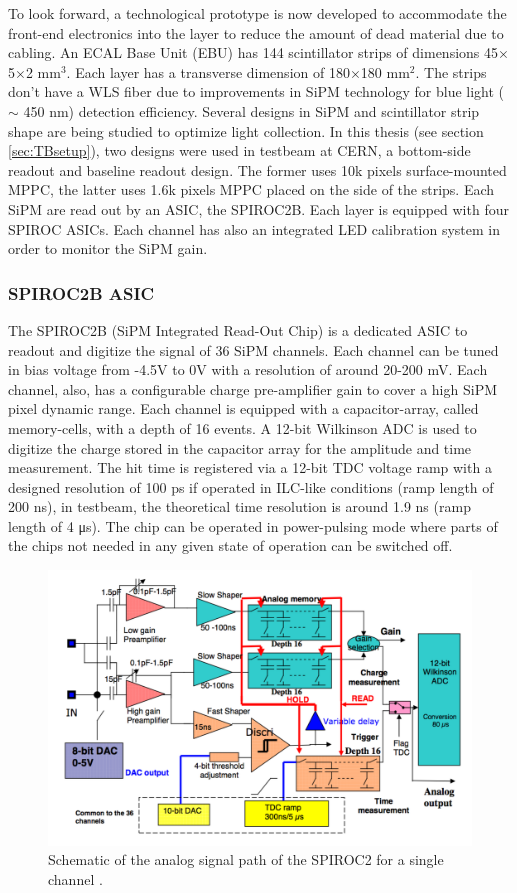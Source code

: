 To look forward, a technological prototype is now developed to accommodate the front-end electronics into the layer to reduce the amount of dead material due to cabling. An ECAL Base Unit (EBU) has 144 scintillator strips of dimensions 45$\times$5$\times$2 mm$^3$. Each layer has a transverse dimension of 180$\times$180 mm$^2$. The strips don't have a WLS fiber due to improvements in SiPM technology for blue light ($\sim$ 450 nm) detection efficiency. Several designs in SiPM and scintillator strip shape are being studied to optimize light collection. In this thesis (see section \ref{sec:TBsetup}), two designs were used in testbeam at CERN, a bottom-side readout and baseline readout design. The former uses 10k pixels surface-mounted MPPC, the latter uses 1.6k pixels MPPC placed on the side of the strips. Each SiPM are read out by an ASIC, the SPIROC2B. Each layer is equipped with four SPIROC ASICs. Each channel has also an integrated LED calibration system in order to monitor the SiPM gain.

\subsubsection{SPIROC2B ASIC}

The SPIROC2B (SiPM Integrated Read-Out Chip) is a dedicated ASIC to readout and digitize the signal of 36 SiPM channels. Each channel can be tuned in bias voltage from -4.5V to 0V with a resolution of around 20-200 mV. Each channel, also, has a configurable charge pre-amplifier gain to cover a high SiPM pixel dynamic range. Each channel is equipped with a capacitor-array, called memory-cells, with a depth of 16 events. A 12-bit Wilkinson ADC is used to digitize the charge stored in the capacitor array for the amplitude and time measurement. The hit time is registered via a 12-bit TDC voltage ramp with a designed resolution of 100 ps if operated in ILC-like conditions (ramp length of 200 \si{\nano\second}), in testbeam, the theoretical time resolution is around 1.9 ns (ramp length of 4 \si{\micro\second}). The chip can be operated in power-pulsing mode where parts of the chips not needed in any given state of operation can be switched off.

\begin{figure}[htbp!]
  \centering
  \includegraphics[width=0.7\linewidth]{chap3/fig/SPIROC2B_schematic.png}
  \caption{Schematic of the analog signal path of the SPIROC2 for a single channel \cite{SPIROC2_datasheet}.} \label{fig:SPIROC2B_sche}
\end{figure}

